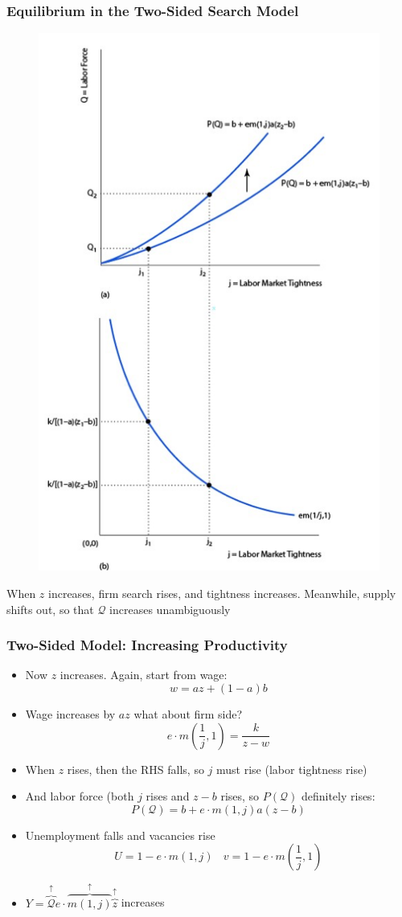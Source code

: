 \documentclass{beamer}
\begin{document}
\begin{frame}
\frametitle[alignment=center]{Equilibrium in the Two-Sided Search Model}
\begin{figure}
\centering
\includegraphics[scale=0.5]{Figures/W_Fig_6pt22.png}
\end{figure}
When $z$ increases, firm search rises, and tightness increases.  Meanwhile, supply shifts out, so that $\mathcal{Q}$ increases unambiguously 
\end{frame}



\begin{frame}
\frametitle[alignment=center]{Two-Sided Model:  Increasing Productivity}
\begin{itemize}
\item Now $z$ increases.  Again, start from wage: 
$$w=az+(1-a)b$$
\item Wage increases by $az$ what about firm side?
$$e\cdot m\left(\frac{1}{j},1\right)=\frac{k}{z-w}$$
\item When $z$ rises, then the RHS falls, so $j$ must rise (labor tightness rise)
\item And labor force (both $j$ rises and $z-b$ rises, so $P(\mathcal{Q})$ definitely rises:
$$P(\mathcal{Q})=b+e\cdot m(1,j)a(z-b)$$
\item Unemployment falls and vacancies rise
$$U=1-e\cdot m(1,j)\ \ \ \ v=1-e\cdot m\left(\frac{1}{j},1\right)$$
\item  $Y=\overbrace{\mathcal{Q}}^{\uparrow}e\cdot \overbrace{m(1,j)}^{\uparrow}\overbrace{z}^{\uparrow}$ increases
\end{itemize}
\end{frame}
\end{document}
